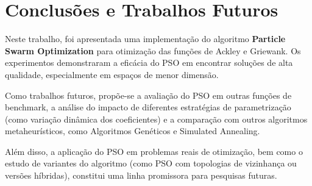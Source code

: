 \documentclass[12pt]{article}
\begin{document}
\section{Conclusões e Trabalhos Futuros}
\label{sec:conclusoes_e_trabalhos_futuros}

Neste trabalho, foi apresentada uma implementação do algoritmo \textbf{Particle Swarm Optimization} para otimização das funções de Ackley e Griewank. Os experimentos demonstraram a eficácia do PSO em encontrar soluções de alta qualidade, especialmente em espaços de menor dimensão.

Como trabalhos futuros, propõe-se a avaliação do PSO em outras funções de benchmark, a análise do impacto de diferentes estratégias de parametrização (como variação dinâmica dos coeficientes) e a comparação com outros algoritmos metaheurísticos, como Algoritmos Genéticos e Simulated Annealing.

Além disso, a aplicação do PSO em problemas reais de otimização, bem como o estudo de variantes do algoritmo (como PSO com topologias de vizinhança ou versões híbridas), constitui uma linha promissora para pesquisas futuras.



\end{document}
